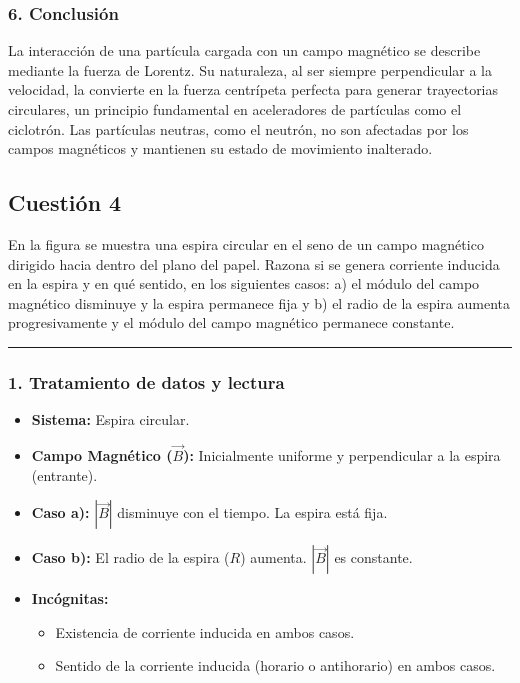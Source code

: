 \subsubsection*{6. Conclusión}
\begin{cajaconclusion}
La interacción de una partícula cargada con un campo magnético se describe mediante la fuerza de Lorentz. Su naturaleza, al ser siempre perpendicular a la velocidad, la convierte en la fuerza centrípeta perfecta para generar trayectorias circulares, un principio fundamental en aceleradores de partículas como el ciclotrón. Las partículas neutras, como el neutrón, no son afectadas por los campos magnéticos y mantienen su estado de movimiento inalterado.
\end{cajaconclusion}

\newpage

\subsection{Cuestión 4}
\label{subsec:C4_2023_jul_ord}

\begin{cajaenunciado}
En la figura se muestra una espira circular en el seno de un campo magnético dirigido hacia dentro del plano del papel. Razona si se genera corriente inducida en la espira y en qué sentido, en los siguientes casos: a) el módulo del campo magnético disminuye y la espira permanece fija y b) el radio de la espira aumenta progresivamente y el módulo del campo magnético permanece constante.
\end{cajaenunciado}
\hrule

\subsubsection*{1. Tratamiento de datos y lectura}
\begin{itemize}
    \item \textbf{Sistema:} Espira circular.
    \item \textbf{Campo Magnético ($\vec{B}$):} Inicialmente uniforme y perpendicular a la espira (entrante).
    \item \textbf{Caso a):} $|\vec{B}|$ disminuye con el tiempo. La espira está fija.
    \item \textbf{Caso b):} El radio de la espira ($R$) aumenta. $|\vec{B}|$ es constante.
    \item \textbf{Incógnitas:}
    \begin{itemize}
        \item Existencia de corriente inducida en ambos casos.
        \item Sentido de la corriente inducida (horario o antihorario) en ambos casos.
    \end{itemize}
\end{itemize}

